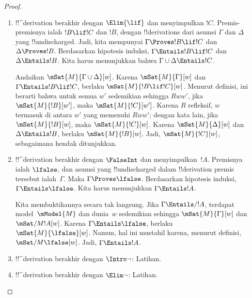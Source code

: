 \documentclass[../../../include/open-logic-section]{subfiles}
\begin{document}
\begin{proof}
\begin{enumerate}
    Andaikan $\mSat{M}{\Gamma}[w]$. Kita hendak menunjukkan bahwa untuk
    semua $w'$ sedemikian sehingga $Rww'$, jika $\mSat{M}{!B}[w']$, maka
    $\mSat{M}{!C}[w']$. Jadi, andaikan $Rww'$ dan
    $\mSat{M}{!B}[w']$. Berdasarkan
    ,
    $\mSat{M}{\Gamma}[w']$. Karena $\Gamma \cup \{!B\} \Entails !C$,
    berlaku $\mSat{M}{!C}[w']$, sebagaimana hendak ditunjukkan.

  \item !!^{derivation} berakhir dengan $\Elim{\lif}$ dan menyimpulkan
    $!C$. Premis-premisnya ialah $!B \lif !C$ dan $!B$, dengan
    !!{derivation}s dari asumsi $\Gamma$ dan $\Delta$ yang
    !!{undischarged}. Jadi, kita mempunyai $\Gamma \Proves !B \lif !C$
    dan $\Delta \Proves !B$. Berdasarkan hipotesis induksi,
    $\Gamma \Entails !B \lif !C$ dan $\Delta \Entails !B$. Kita harus
    menunjukkan bahwa $\Gamma \cup \Delta \Entails !C$.

    Andaikan $\mSat{M}{\Gamma \cup \Delta}[w]$. Karena
    $\mSat{M}{\Gamma}[w]$ dan $\Gamma \Entails !B \lif !C$, berlaku
    $\mSat{M}{!B \lif !C}[w]$. Menurut definisi, ini berarti bahwa untuk
    semua $w'$ sedemikian sehingga $Rww'$, jika $\mSat{M}{!B}[w']$, maka
    $\mSat{M}{!C}[w']$. Karena $R$ refleksif, $w$ termasuk di antara $w'$
    yang memenuhi $Rww'$; dengan kata lain, jika $\mSat{M}{!B}[w]$, maka
    $\mSat{M}{!C}[w]$. Karena $\mSat{M}{\Delta}[w]$ dan
    $\Delta \Entails !B$, berlaku $\mSat{M}{!B}[w]$. Jadi,
    $\mSat{M}{!C}[w]$, sebagaimana hendak ditunjukkan.

  \item !!^{derivation} berakhir dengan $\FalseInt$ dan menyimpulkan~$!A$.
    Premisnya ialah $\lfalse$, dan asumsi yang !!{undischarged} dalam
    !!{derivation} premis tersebut ialah~$\Gamma$. Maka
    $\Gamma \Proves \lfalse$. Berdasarkan hipotesis induksi,
    $\Gamma \Entails \lfalse$. Kita harus menunjukkan
    $\Gamma \Entails !A$.

    Kita membuktikannya secara tak langsung. Jika $\Gamma \Entails/ !A$,
    terdapat model~$\mModel{M}$ dan dunia~$w$ sedemikian sehingga
    $\mSat{M}{\Gamma}[w]$ dan $\mSat/{M}{!A}[w]$. Karena
    $\Gamma \Entails \lfalse$, berlaku $\mSat{M}{\lfalse}[w]$. Namun,
    hal ini mustahil karena, menurut definisi,
    $\mSat/{M}{\lfalse}[w]$. Jadi, $\Gamma \Entails !A$.
  \item !!^{derivation} berakhir dengan $\Intro\lnot$: Latihan.
  \item !!^{derivation} berakhir dengan $\Elim\lnot$: Latihan.
  \end{enumerate}
\end{proof}
\end{document}
